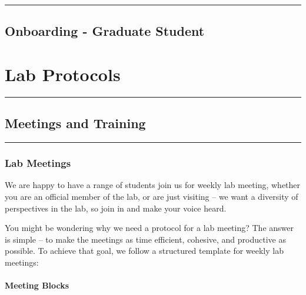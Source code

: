 \documentclass[]{book}
\begin{document}
\begin{center}\rule{0.5\linewidth}{\linethickness}\end{center}

\hypertarget{onboarding---graduate-student}{%
\section{Onboarding - Graduate Student}\label{onboarding---graduate-student}}

\hypertarget{lab-protocols}{%
\chapter{Lab Protocols}\label{lab-protocols}}

\begin{center}\rule{0.5\linewidth}{\linethickness}\end{center}

\hypertarget{meetings-and-training}{%
\section{Meetings and Training}\label{meetings-and-training}}

\begin{center}\rule{0.5\linewidth}{\linethickness}\end{center}

\hypertarget{lab-meetings}{%
\subsection{Lab Meetings}\label{lab-meetings}}

We are happy to have a range of students join us for weekly lab meeting, whether you are an official member of the lab, or are just visiting -- we want a diversity of perspectives in the lab, so join in and make your voice heard.

You might be wondering why we need a protocol for a lab meeting? The answer is simple -- to make the meetings as time efficient, cohesive, and productive as possible. To achieve that goal, we follow a structured template for weekly lab meetings:

\hypertarget{meeting-blocks}{%
\subsubsection{Meeting Blocks}\label{meeting-blocks}}
\end{document}
